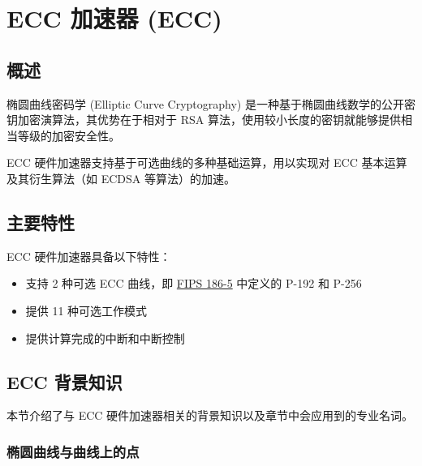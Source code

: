 \documentclass[main\_\_CN.tex]{subfiles}
\begin{document}

\ifglobal
\else
    {\let\clearpage\relax \listoftodos}
    {\let\clearpage\relax \listofdonetodos}
    \tableofcontents
\fi



\hypertarget{ecc}{}
\chapter{ECC 加速器 (ECC)}
\label{mod:ecc}

\section{概述}
椭圆曲线密码学 (Elliptic Curve Cryptography) 是一种基于椭圆曲线数学的公开密钥加密演算法，其优势在于相对于 RSA 算法，使用较小长度的密钥就能够提供相当等级的加密安全性。

\chipname{} ECC 硬件加速器支持基于可选曲线的多种基础运算，用以实现对 ECC 基本运算及其衍生算法（如 ECDSA 等算法）的加速。

\section{主要特性}
\chipname{} ECC 硬件加速器具备以下特性：

\begin{itemize}
    \item 支持 2 种可选 ECC 曲线，即 \href{https://nvlpubs.nist.gov/nistpubs/FIPS/NIST.FIPS.186-5.pdf}{FIPS 186-5} 中定义的 P-192 和 P-256
    \item 提供 11 种可选工作模式
    \item 提供计算完成的中断和中断控制
\end{itemize}

\section{ECC 背景知识}
本节介绍了与 ECC 硬件加速器相关的背景知识以及章节中会应用到的专业名词。


\subsection{椭圆曲线与曲线上的点}
\end{document}
